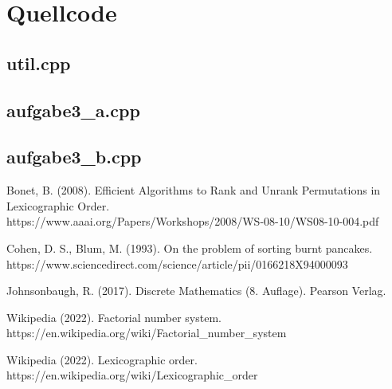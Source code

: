 \documentclass[a4paper, 10pt, ngerman]{article}
\begin{document}
\section{Quellcode}

\subsection{util.cpp}



\subsection{aufgabe3\_a.cpp}



\subsection{aufgabe3\_b.cpp}



\begin{thebibliography}{5}
    Bonet, B. (2008).
    Efficient Algorithms to Rank and Unrank Permutations in Lexicographic Order. \\
    https://www.aaai.org/Papers/Workshops/2008/WS-08-10/WS08-10-004.pdf

    Cohen, D. S., Blum, M. (1993).
    On the problem of sorting burnt pancakes. \\
    https://www.sciencedirect.com/science/article/pii/0166218X94000093

    Johnsonbaugh, R. (2017).
    Discrete Mathematics (8. Auflage).
    Pearson Verlag.

    Wikipedia (2022).
    Factorial number system. \\
    https://en.wikipedia.org/wiki/Factorial\_number\_system

    Wikipedia (2022).
    Lexicographic order. \\
    https://en.wikipedia.org/wiki/Lexicographic\_order
\end{thebibliography}
\end{document}
